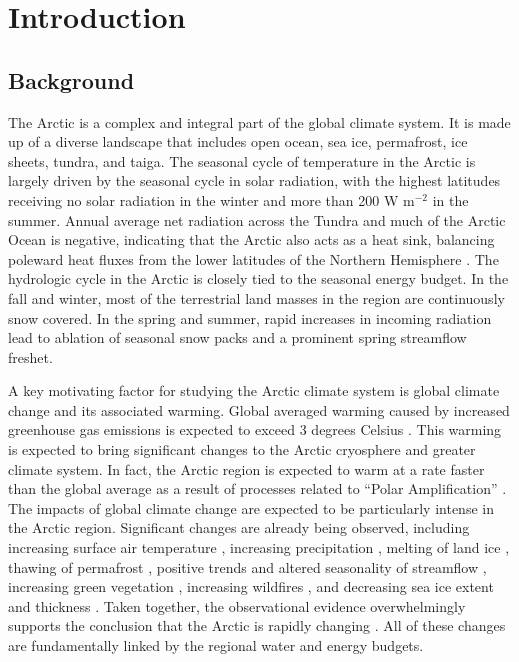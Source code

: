 \chapter{Introduction}
\label{chap:intro}

\section{Background}

The Arctic is a complex and integral part of the global climate system.
It is made up of a diverse landscape that includes open ocean, sea ice, permafrost, ice sheets, tundra, and taiga.
The seasonal cycle of temperature in the Arctic is largely driven by the seasonal cycle in solar radiation, with the highest latitudes receiving no solar radiation in the winter and more than 200 W m$^{-2}$ in the summer.
Annual average net radiation across the Tundra and much of the Arctic Ocean is negative, indicating that the Arctic also acts as a heat sink, balancing poleward heat fluxes from the lower latitudes of the Northern Hemisphere \citep{Serreze_2007}.
The hydrologic cycle in the Arctic is closely tied to the seasonal energy budget.
In the fall and winter, most of the terrestrial land masses in the region are continuously snow covered.
In the spring and summer, rapid increases in incoming radiation lead to ablation of seasonal snow packs and a prominent spring streamflow freshet.

A key motivating factor for studying the Arctic climate system is global climate change and its associated warming.
Global averaged warming caused by increased greenhouse gas emissions is expected to exceed 3 degrees Celsius \citep{IPCC_2014}.
This warming is expected to bring significant changes to the Arctic cryosphere and greater climate system.
In fact, the Arctic region is expected to warm at a rate faster than the global average as a result of processes related to ``Polar Amplification'' \citep[e.g.][]{Serreze_2006c,Holland_2003}.
The impacts of global climate change are expected to be particularly intense in the Arctic region.
Significant changes are already being observed, including increasing surface air temperature \citep[e.g.][]{Rigor_2000}, increasing precipitation \citep[e.g.][]{Min_2008}, melting of land ice \citep[e.g.][]{Gardner_2011}, thawing of permafrost \citep[e.g.]{Serreze_2000,Osterkamp_1999}, positive trends and altered seasonality of streamflow \citep[e.g.][]{Dai_2009,McClelland_2006,Peterson_2002,Smith_2007,StJacques_2009}, increasing green vegetation \citep[e.g.][]{Stow_2004,Xu_2013}, increasing wildfires \citep[e.g.][]{Kely_2013}, and decreasing sea ice extent and thickness \citep[e.g.][]{Serreze_2000}.
Taken together, the observational evidence overwhelmingly supports the conclusion that the Arctic is rapidly changing \citep{Serreze_2006b}.
All of these changes are fundamentally linked by the regional water and energy budgets.


